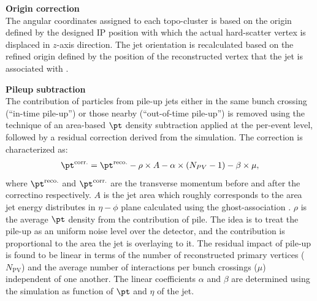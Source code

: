 \begin{description}
\item \textbf{Origin correction} \\
The angular coordinates assigned to each topo-cluster is based on the origin defined by the designed IP position with which the actual hard-scatter vertex is displaced in $z$-axis direction. The jet orientation is recalculated based on the refined origin defined by the position of the reconstructed vertex that the jet is associated with \cite{JESmeas_unct_Run1_inclOC}. \\


\item \textbf{Pileup subtraction} \\
The contribution of particles from pile-up jets either in the same bunch crossing (``in-time pile-up'') or those nearby (``out-of-time pile-up'') is removed using the technique of an area-based $\pt$ density subtraction \cite{145_areaBasedPUsub} applied at the per-event level, followed by a residual correction derived from the simulation. The correction is characterized as:
\begin{align}
\pt^{\mathrm{corr.}} = \pt^{\mathrm{reco.}} - \rho \times A - \alpha  \times (N_{PV}-1) - \beta \times \mu,
\label{eq::PUresidual}
\end{align}
where $\pt^{\mathrm{reco.}}$ and $\pt^{\mathrm{corr.}}$ are the transverse momentum before and after the correctino respectively. $A$ is the jet area which roughly corresponds to the area jet energy distributes in $\eta-\phi$ plane calculated using the ghost-association \cite{143_JetFindingReview}. $\rho$ is the average $\pt$ density from the contribution of pile. The idea is to treat the pile-up as an uniform noise level over the detector, and the contribution is proportional to the area the jet is overlaying to it. 
The residual impact of pile-up is found to be linear in terms of the number of reconstructed primary vertices ($N_{\mathrm{PV}}$) and the average number of interactions per bunch crossings ($\mu$) independent of one another.
The linear coefficients $\alpha$ and $\beta$ are determined using the simulation as function of $\pt$ and $\eta$ of the jet.





\end{description}
